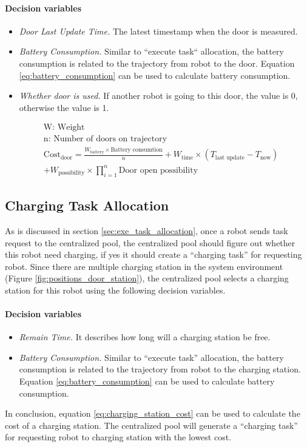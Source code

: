 \paragraph*{Decision variables}
\begin{itemize}
	\item \textsl{Door Last Update Time.} The latest timestamp when the door is measured.
	\item \textsl{Battery Consumption.} Similar to ``execute task`` allocation, the battery consumption is related to the trajectory from robot to the door. Equation \ref{eq:battery_consumption} can be used to calculate battery consumption.
	\item \textsl{Whether door is used.} If another robot is going to this door, the value is 0, otherwise the value is 1.
\end{itemize}

\begin{equation}
	\label{eq:door_cost}
	\begin{aligned}
	& \mbox{W: Weight } \\
	& \mbox{n: Number of doors on trajectory} \\	
	& \mbox{Cost}_{\mbox{door}} = \frac{W_{\mbox{battery}} \times \mbox{Battery consumtion}}{n} + W_{\mbox{time}} \times (T_{\mbox{last update}} - T_{\mbox{now}}) \\
	& + W_{\mbox{possibility}} \times \prod\limits_{i=1}^n \mbox{Door open possibility}
	\end{aligned}
\end{equation}

\subsection{Charging Task Allocation}
As is discussed in section \ref{sec:exe_task_allocation}, once a robot sends task request to the centralized pool, the centralized pool should figure out whether this robot need charging, if yes it should create a ``charging task'' for requesting robot. Since there are multiple charging station in the system environment (Figure \ref{fig:positions_door_station}), the centralized pool selects a charging station for this robot using the following decision variables.
\paragraph*{Decision variables}

\begin{itemize}
	\item \textsl{Remain Time.} It describes how long will a charging station be free. 
	\item \textsl{Battery Consumption.} Similar to ``execute task'' allocation, the battery consumption is related to the trajectory from robot to the charging station. Equation \ref{eq:battery_consumption} can be used to calculate battery consumption.
\end{itemize}
In conclusion, equation \ref{eq:charging_station_cost} can be used to calculate the cost of a charging station. The centralized pool will generate a ``charging task'' for requesting robot to charging station with the lowest cost.

